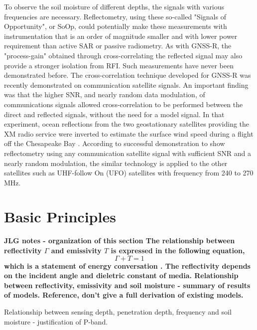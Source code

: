 \documentclass[draftcls,onecolumn]{IEEEtran}  %
\begin{document}
To observe the soil moisture of different depths, the signals with various frequencies are necessary. Reflectometry, using these so-called "Signals of Opportunity", or SoOp, could potentially make these measurements with instrumentation that is an order of magnitude smaller and with lower power requirement than active SAR or passive radiometry. As with GNSS-R, the "process-gain" obtained through cross-correlating the reflected signal may also provide a stronger isolation from RFI. Such measurements have never been demonstrated before. The cross-correlation technique developed for GNSS-R was recently demonstrated on communication satellite signals. An important finding was that the higher SNR, and nearly random data modulation, of communications signals allowed cross-correlation to be performed between the direct and reflected signals, without the need for a model signal. In that experiment, ocean reflections from the two geostationary satellites providing the XM radio service were inverted to estimate the surface wind speed during a flight off the Chesapeake Bay \cite{Shah:2011}. According to successful demonstration to show reflectometry using any communication satellite signal with sufficient SNR and a nearly random modulation, the similar technology is applied to the other satellites such as UHF-follow On (UFO) satellites with frequency from 240 to 270 MHz.





\section{Basic Principles}

\bf JLG notes - organization of this section \rm 
The relationship between reflectivity $\Gamma$ and emissivity $T$ is expressed in the following equation,
\begin{equation}
\Gamma + T = 1
\end{equation}
which is a statement of energy conversation \cite{Ulaby:1981}. The reflectivity depends on the incident angle and dieletric constant of media.
Relationship between reflectivity, emissivity and soil moisture - summary of results of models.  Reference, don't give a full derivation of existing models.

Relationship between sensing depth, penetration depth, frequency and soil moisture - justification of P-band. 
\end{document}
